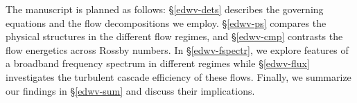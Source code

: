 \documentclass[../Rajarshi-thesis-draft.tex]{subfiles}
\begin{document}
The manuscript is planned as follows:  \S \ref{edwv-dets} describes the governing equations and the flow decompositions we employ. \S \ref{edwv-ps} compares the physical structures in the different flow regimes, and \S \ref{edwv-cmp} contrasts the flow energetics across Rossby numbers. In \S \ref{edwv-fspectr}, we explore features of a broadband frequency spectrum in different regimes while  \S \ref{edwv-flux} investigates the turbulent cascade efficiency of these flows. Finally, we summarize our findings in \S \ref{edwv-sum} and discuss their implications.


 



 
\end{document}
